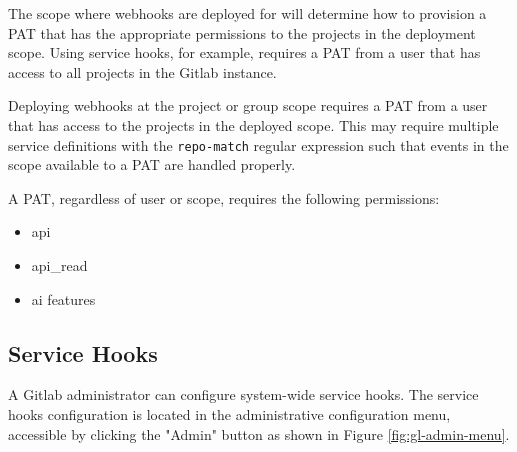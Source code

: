 The scope where webhooks are deployed for \cxoneflow will determine how to provision a PAT
that has the appropriate permissions to the projects in the deployment scope.  Using service
hooks, for example, requires a PAT from a user that has access to all projects in the Gitlab
instance.

Deploying webhooks at the project or group scope requires a PAT from a user that has access
to the projects in the deployed scope.  This may require multiple \cxoneflow service definitions
with the \texttt{repo-match} regular expression such that events in the scope available to a
PAT are handled properly.

A PAT, regardless of user or scope, requires the following permissions:

\begin{itemize}
  \item api
  \item api\_read
  \item ai features
\end{itemize}

\subsection{Service Hooks}

A Gitlab administrator can configure system-wide service hooks.  The service hooks configuration is located in the
administrative configuration menu, accessible by clicking the "Admin" button as shown in Figure \ref{fig:gl-admin-menu}.

